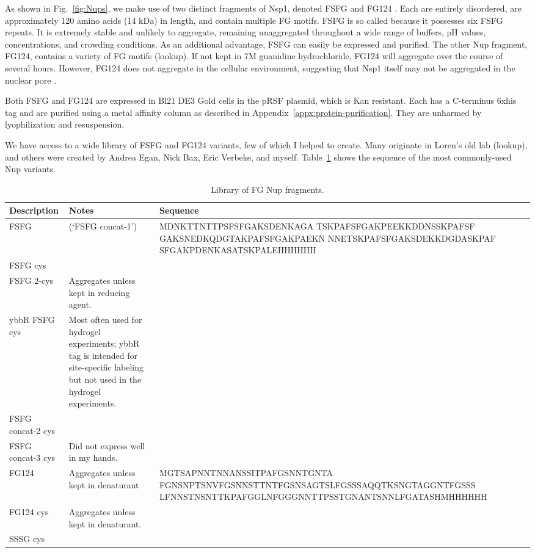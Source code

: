 As shown in Fig.~\ref{fig:Nups}, we make use of two distinct fragments of Nsp1, denoted FSFG and FG124 \cite{hough15}.  Each are entirely disordered, are approximately 120 amino acids (14 kDa) in length, and contain multiple FG motifs.  FSFG is so called because it possesses six FSFG repeats.  It is extremely stable and unlikely to aggregate, remaining unaggregated throughout a wide range of buffers, pH values, concentrations, and crowding conditions.  As an additional advantage, FSFG can easily be expressed and purified.  The other Nup fragment, FG124, contains a variety of FG motifs (lookup).  If not kept in 7M guanidine hydrochloride, FG124 will aggregate over the course of several hours.  However, FG124 does not aggregate in the cellular environment, suggesting that Nsp1 itself may not be aggregated in the nuclear pore \cite{hough15}. 

Both FSFG and FG124 are expressed in Bl21 DE3 Gold cells in the pRSF plasmid, which is Kan resistant.  Each has a C-terminus 6xhis tag and are purified using a metal affinity column as described in Appendix~\ref{appx:protein-purification}.  They are unharmed by lyophilization and resuspension.

We have access to a wide library of FSFG and FG124 variants, few of which I helped to create. Many originate in Loren's old lab (lookup), and others were created by Andrea Egan, Nick Bax, Eric Verbeke, and myself. Table~\ref{table:Nups} shows the sequence of the most commonly-used Nup variants.

\begin{table}[b!]
\centering
  \caption{Library of FG Nup fragments.}
    \label{table:Nups}
    \begin{tabular}{p{3.5cm}p{4cm}p{8cm}}
      Description & Notes &Sequence \\
      \hline
      FSFG & (`FSFG concat-1') & MDNKTTNTTPSFSFGAKSDENKAGA TSKPAFSFGAKPEEKKDDNSSKPAFSF GAKSNEDKQDGTAKPAFSFGAKPAEKN NNETSKPAFSFGAKSDEKKDGDASKPAF SFGAKPDENKASATSKPALEHHHHHH\\
	FSFG cys & & \\
	FSFG 2-cys & Aggregates unless kept in reducing agent. & \\
	ybbR FSFG cys & Most often used for hydrogel experiments; ybbR tag is intended for site-specific labeling but not used in the hydrogel experiments.& \\
	FSFG concat-2 cys & & \\
	FSFG concat-3 cys & Did not express well in my hands.& \\
	FG124 & Aggregates unless kept in denaturant & MGTSAPNNTNNANSSITPAFGSNNTGNTA
FGNSNPTSNVFGSNNSTTNTFGSNSAGTSLFGSSSAQQTKSNGTAGGNTFGSSS
LFNNSTNSNTTKPAFGGLNFGGGNNTTPSSTGNANTSNNLFGATASHMHHHHHH\\
	FG124 cys & Aggregates unless kept in denaturant. & \\
	SSSG cys & & \\

    \end{tabular}
\end{table}

